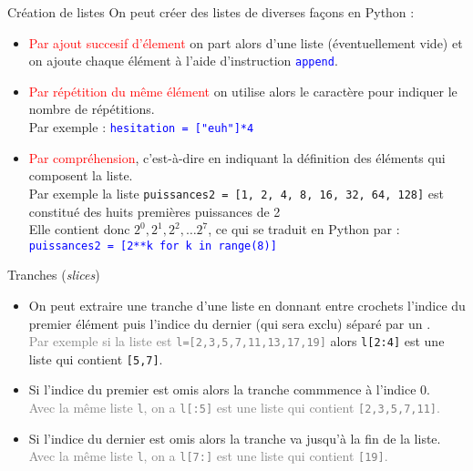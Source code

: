 \documentclass[10pt]{beamer}
\begin{document}
\begin{frame}[fragile]{\Ctitle}{\stitle}
	\begin{alertblock}{Création de listes}
		On peut créer des listes de diverses façons en Python :
		\begin{itemize}
			\item<2-> \textcolor{red}{Par ajout succesif d'élement} on part alors d'une liste (éventuellement vide) et on ajoute chaque élément à l'aide d'instruction \textcolor{blue}{\tt append}.
			\item<3-> \textcolor{red}{Par répétition du même élément} on utilise alors le caractère \textcolor{blue}{\tt *} pour indiquer le nombre de répétitions. \\
			      \onslide<4-> {Par exemple : \textcolor{blue}{\tt hesitation = ["euh"]*4}}
			\item<6->	 \textcolor{red}{Par compréhension}, c'est-à-dire en indiquant la définition des éléments qui composent la liste. \\
			      \onslide<7-> {Par exemple la liste {\tt puissances2 = [1, 2, 4, 8, 16, 32, 64, 128]} est constitué des huits premières puissances de 2} \\
			      \onslide<8-> {Elle contient donc $2^0, 2^1, 2^2, \dots 2^7$, ce qui se traduit en Python par :}\\
			      \onslide<9-> \textcolor{blue}{\tt puissances2 = [2**k for k in range(8)]}
		\end{itemize}
	\end{alertblock}
\end{frame}

\begin{frame}[fragile]{\Ctitle}{\stitle}
	\begin{alertblock}{Tranches (\textit{slices})}
		\begin{itemize}
		\item<1->On peut extraire une tranche d'une liste en donnant entre crochets l'indice du premier élément puis l'indice du dernier (qui sera exclu) séparé par un \kw{:}.\\
		\onslide<2->\textcolor{gray}{\small Par exemple si la liste est {\tt l=[2,3,5,7,11,13,17,19]}} alors {\tt l[2:4]} est une liste qui contient {\tt [5,7]}.
		\item<3-> Si l'indice du premier est omis alors la tranche commmence à l'indice 0.\\
		\onslide<4->\textcolor{gray}{\small Avec la même liste {\tt l}, on a {\tt l[:5]} est une liste qui contient {\tt [2,3,5,7,11]}.}
		\item<5-> Si l'indice du dernier est omis alors la tranche va jusqu'à la fin de la liste.\\
		\onslide<6->\textcolor{gray}{\small Avec la même liste {\tt l}, on a {\tt l[7:]} est une liste qui contient {\tt [19]}.}
		\end{itemize}
	\end{alertblock}
\end{frame}
\end{document}
